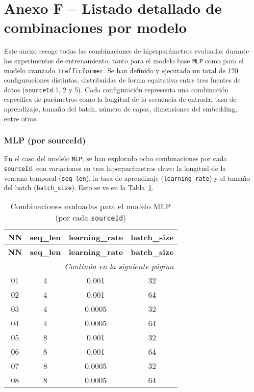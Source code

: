 \section*{Anexo F – Listado detallado de combinaciones por modelo}
\label{anexo:combinaciones_exp}

Este anexo recoge todas las combinaciones de hiperparámetros evaluadas durante los experimentos de entrenamiento, tanto para el modelo base \texttt{MLP} como para el modelo avanzado \texttt{Trafficformer}. Se han definido y ejecutado un total de 120 configuraciones distintas, distribuidas de forma equitativa entre tres fuentes de datos (\texttt{sourceId} 1, 2 y 5). Cada configuración representa una combinación específica de parámetros como la longitud de la secuencia de entrada, tasa de aprendizaje, tamaño del batch, número de capas, dimensiones del embedding, entre otros.

\subsubsection*{MLP (por sourceId)}

En el caso del modelo \texttt{MLP}, se han explorado ocho combinaciones por cada \texttt{sourceId}, con variaciones en tres hiperparámetros clave: la longitud de la ventana temporal (\texttt{seq\_len}), la tasa de aprendizaje (\texttt{learning\_rate}) y el tamaño del batch (\texttt{batch\_size}). Esto se ve en la Tabla~\ref{tab:mlp_combinaciones}.

\begin{longtable}{c | c | c | c}
	\caption{Combinaciones evaluadas para el modelo MLP (por cada \texttt{sourceId})}
	\label{tab:mlp_combinaciones} \\
	\toprule
	\textbf{NN} & \textbf{seq\_len} & \textbf{learning\_rate} & \textbf{batch\_size} \\
	\midrule
	\endfirsthead
	
	\toprule
	\textbf{NN} & \textbf{seq\_len} & \textbf{learning\_rate} & \textbf{batch\_size} \\
	\midrule
	\endhead
	
	\midrule
	\multicolumn{4}{r}{\textit{Continúa en la siguiente página}} \\
	\midrule
	\endfoot
	
	\bottomrule
	\endlastfoot
	
	01 & 4 & 0.001  & 32 \\
	02 & 4 & 0.001  & 64 \\
	03 & 4 & 0.0005 & 32 \\
	04 & 4 & 0.0005 & 64 \\
	05 & 8 & 0.001  & 32 \\
	06 & 8 & 0.001  & 64 \\
	07 & 8 & 0.0005 & 32 \\
	08 & 8 & 0.0005 & 64 \\
	
\end{longtable}

